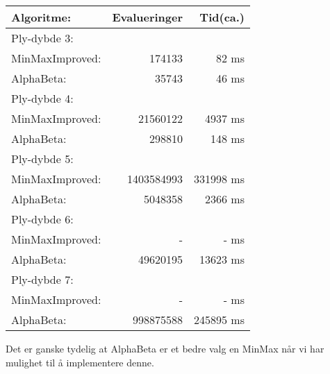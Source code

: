 \documentclass[norsk,a4paper]{article}
\begin{document}
\begin{tabular}{| l| r |r |}
\hline
Algoritme:&Evalueringer&Tid(ca.)\\
\hline
Ply-dybde 3:& & \\
MinMaxImproved:&174133 &82 ms\\
AlphaBeta:&35743 & 46 ms \\
\hline
Ply-dybde 4:& & \\
MinMaxImproved:&21560122 &4937 ms\\
AlphaBeta:&298810 & 148 ms \\
\hline
Ply-dybde 5:& & \\
MinMaxImproved:& 1403584993 & 331998 ms\\
AlphaBeta:&5048358 & 2366 ms \\
\hline
Ply-dybde 6:& & \\
MinMaxImproved:&- &- ms\\
AlphaBeta:&49620195 & 13623 ms \\
\hline
Ply-dybde 7:& & \\
MinMaxImproved:&- &- ms\\
AlphaBeta:&998875588 & 245895 ms \\
\hline
\end{tabular}
 
 Det er ganske tydelig at AlphaBeta er et bedre valg en MinMax når vi har
 mulighet til å implementere denne.
 
\end{document}
